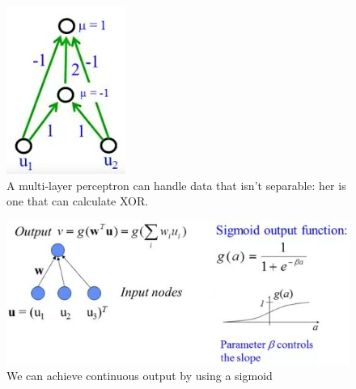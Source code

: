 \documentclass[]{article}
\begin{document}
\begin{figure}[H]
	\begin{center}
		\caption[A multi-layer perceptron]{A multi-layer perceptron can handle data that isn't separable: her is one that can calculate XOR.}
		\includegraphics[width=\textwidth]{mlp-xor}
	\end{center}
\end{figure}

\begin{figure}[H]
	\begin{center}
		\caption[Multi-layer perceptron with continuous output]{We can achieve continuous output by using a sigmoid}
		\includegraphics[width=\textwidth]{continuous-sigmoid}
	\end{center}
\end{figure}
\end{document}
